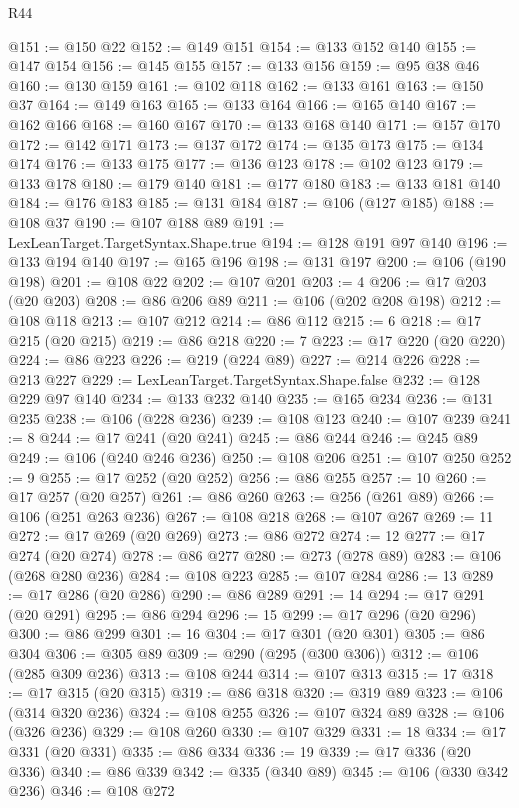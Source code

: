 \begin{lexlean}{R44}
\begin{coremodule}
@151 := @150 @22
@152 := @149 @151
@154 := @133 @152 @140
@155 := @147 @154
@156 := @145 @155
@157 := @133 @156
@159 := @95 @38 @46
@160 := @130 @159
@161 := @102 @118
@162 := @133 @161
@163 := @150 @37
@164 := @149 @163
@165 := @133 @164
@166 := @165 @140
@167 := @162 @166
@168 := @160 @167
@170 := @133 @168 @140
@171 := @157 @170
@172 := @142 @171
@173 := @137 @172
@174 := @135 @173
@175 := @134 @174
@176 := @133 @175
@177 := @136 @123
@178 := @102 @123
@179 := @133 @178
@180 := @179 @140
@181 := @177 @180
@183 := @133 @181 @140
@184 := @176 @183
@185 := @131 @184
@187 := @106 (@127 @185)
@188 := @108 @37
@190 := @107 @188 @89
@191 := LexLeanTarget.TargetSyntax.Shape.true
@194 := @128 @191 @97 @140
@196 := @133 @194 @140
@197 := @165 @196
@198 := @131 @197
@200 := @106 (@190 @198)
@201 := @108 @22
@202 := @107 @201
@203 := 4
@206 := @17 @203 (@20 @203)
@208 := @86 @206 @89
@211 := @106 (@202 @208 @198)
@212 := @108 @118
@213 := @107 @212
@214 := @86 @112
@215 := 6
@218 := @17 @215 (@20 @215)
@219 := @86 @218
@220 := 7
@223 := @17 @220 (@20 @220)
@224 := @86 @223
@226 := @219 (@224 @89)
@227 := @214 @226
@228 := @213 @227
@229 := LexLeanTarget.TargetSyntax.Shape.false
@232 := @128 @229 @97 @140
@234 := @133 @232 @140
@235 := @165 @234
@236 := @131 @235
@238 := @106 (@228 @236)
@239 := @108 @123
@240 := @107 @239
@241 := 8
@244 := @17 @241 (@20 @241)
@245 := @86 @244
@246 := @245 @89
@249 := @106 (@240 @246 @236)
@250 := @108 @206
@251 := @107 @250
@252 := 9
@255 := @17 @252 (@20 @252)
@256 := @86 @255
@257 := 10
@260 := @17 @257 (@20 @257)
@261 := @86 @260
@263 := @256 (@261 @89)
@266 := @106 (@251 @263 @236)
@267 := @108 @218
@268 := @107 @267
@269 := 11
@272 := @17 @269 (@20 @269)
@273 := @86 @272
@274 := 12
@277 := @17 @274 (@20 @274)
@278 := @86 @277
@280 := @273 (@278 @89)
@283 := @106 (@268 @280 @236)
@284 := @108 @223
@285 := @107 @284
@286 := 13
@289 := @17 @286 (@20 @286)
@290 := @86 @289
@291 := 14
@294 := @17 @291 (@20 @291)
@295 := @86 @294
@296 := 15
@299 := @17 @296 (@20 @296)
@300 := @86 @299
@301 := 16
@304 := @17 @301 (@20 @301)
@305 := @86 @304
@306 := @305 @89
@309 := @290 (@295 (@300 @306))
@312 := @106 (@285 @309 @236)
@313 := @108 @244
@314 := @107 @313
@315 := 17
@318 := @17 @315 (@20 @315)
@319 := @86 @318
@320 := @319 @89
@323 := @106 (@314 @320 @236)
@324 := @108 @255
@326 := @107 @324 @89
@328 := @106 (@326 @236)
@329 := @108 @260
@330 := @107 @329
@331 := 18
@334 := @17 @331 (@20 @331)
@335 := @86 @334
@336 := 19
@339 := @17 @336 (@20 @336)
@340 := @86 @339
@342 := @335 (@340 @89)
@345 := @106 (@330 @342 @236)
@346 := @108 @272

\end{coremodule}
\end{lexlean}
